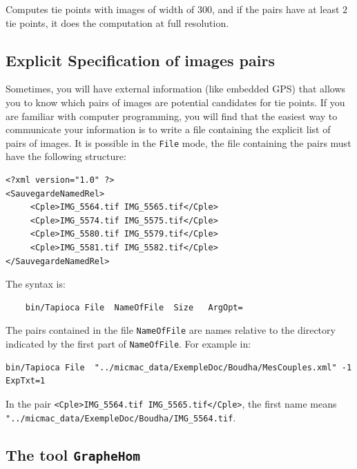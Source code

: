 Computes  tie points with images of width of $300$, and if the pairs have at least
$2$ tie points, it does the computation at full resolution.



\subsection{Explicit Specification of images pairs} %

Sometimes, you will have external information (like embedded GPS) that allows
you to know which pairs of images are potential candidates for tie points.
If you are familiar with computer programming, you will find that
the easiest way to communicate your information is to write a file
containing the explicit list of pairs of images.
It is possible in the {\tt File} mode, the file containing
the pairs must have the following structure:

{\scriptsize
\begin{verbatim}
<?xml version="1.0" ?>
<SauvegardeNamedRel>
     <Cple>IMG_5564.tif IMG_5565.tif</Cple>
     <Cple>IMG_5574.tif IMG_5575.tif</Cple>
     <Cple>IMG_5580.tif IMG_5579.tif</Cple>
     <Cple>IMG_5581.tif IMG_5582.tif</Cple>
</SauvegardeNamedRel>
\end{verbatim}
}

The syntax is:


{\scriptsize
\begin{verbatim}
    bin/Tapioca File  NameOfFile  Size   ArgOpt=
\end{verbatim}
}

The pairs contained in the file {\tt NameOfFile} are names relative
to the directory indicated by the first part of {\tt NameOfFile}.
For example in:

{\scriptsize
\begin{verbatim}
bin/Tapioca File  "../micmac_data/ExempleDoc/Boudha/MesCouples.xml" -1  ExpTxt=1
\end{verbatim}
}


In the pair {\tt <Cple>IMG\_5564.tif IMG\_5565.tif</Cple>}, the first name means
\newline
{\tt "../micmac\_data/ExempleDoc/Boudha/IMG\_5564.tif}.




\subsection{The tool {\tt GrapheHom}}

